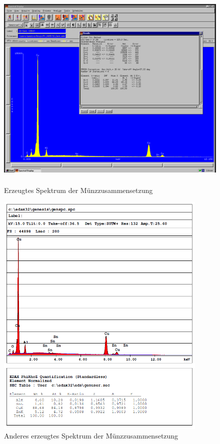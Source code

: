 \documentclass[12pt,english,ngerman]{scrartcl}
\begin{document}
\begin{figure}[H]
	\begin{center}
		\includegraphics[width=\textwidth,height=10cm]{./figures/qualitativ1.png}
	\end{center}
	\caption{Erzeugtes Spektrum der Münzzusammensetzung~\cite{sein_foto}
	}\label{fig:qualitativ1}
\end{figure}

\begin{figure}[H]
	\begin{center}
		\includegraphics[width=\textwidth,height=12cm]{./figures/qualitativ2.png}
	\end{center}
	\caption{Anderes erzeugtes Spektrum der Münzzusammensetzung~\cite{sein_foto}
	}\label{fig:qualitativ2}
\end{figure}
\end{document}
